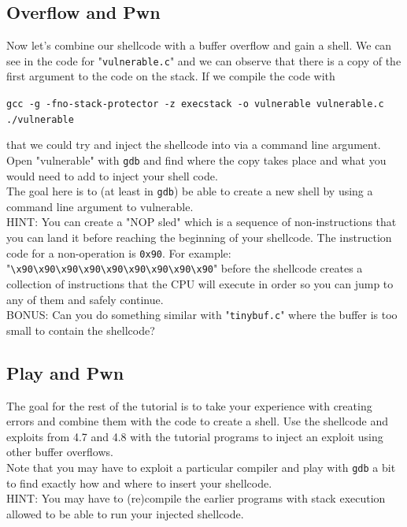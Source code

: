 \documentclass{article}
\begin{document}
\subsection{Overflow and Pwn}
\noindent Now let's combine our shellcode with a buffer overflow and gain a shell. We
can see in the code for "\lstinline{vulnerable.c}" and we can observe that there is a copy
of the first argument to the code on the stack. If we compile the code with
\begin{center}
    \lstinline{gcc -g -fno-stack-protector -z execstack -o vulnerable vulnerable.c}\\
    \lstinline{./vulnerable}
\end{center}
\noindent that we could try and inject the shellcode into via a command line argument.\\

\noindent Open "vulnerable" with \lstinline{gdb} and find where the copy takes place and
what you would need to add to inject your shell code.\\

\noindent The goal here is to (at least in \lstinline{gdb}) be able to create a new shell by using a command line argument to vulnerable.\\

\noindent HINT: You can create a "NOP sled" which is a sequence of non-instructions
that you can land it before reaching the beginning of your shellcode. The
instruction code for a non-operation is \lstinline{0x90}. For example:
"\lstinline{\x90\x90\x90\x90\x90\x90\x90\x90\x90}" before the shellcode creates a
collection of instructions that the CPU will execute in order so you can jump
to any of them and safely continue.\\

\noindent BONUS: Can you do something similar with "\lstinline{tinybuf.c}" where the buffer
is too small to contain the shellcode?

\subsection{Play and Pwn}
The goal for the rest of the tutorial is to take your experience with creating
errors and combine them with the code to create a shell. Use the shellcode
and exploits from 4.7 and 4.8 with the tutorial programs to inject an exploit
using other buffer overflows.\\

\noindent Note that you may have to exploit a particular compiler and play with
\lstinline{gdb} a bit to find exactly how and where to insert your shellcode.\\

\noindent HINT: You may have to (re)compile the earlier programs with stack execution
allowed to be able to run your injected shellcode.
% 
% 
\end{document}
